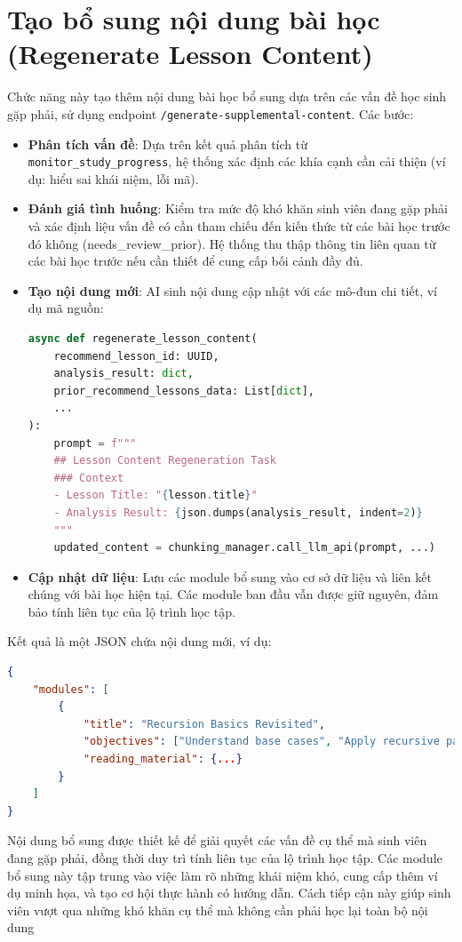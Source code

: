 \section{Tạo bổ sung nội dung bài học (Regenerate Lesson Content)}
Chức năng này tạo thêm nội dung bài học bổ sung dựa trên các vấn đề học sinh gặp phải, sử dụng endpoint \texttt{/generate-supplemental-content}. Các bước:
\begin{itemize}
    \item \textbf{Phân tích vấn đề}: Dựa trên kết quả phân tích từ \texttt{monitor\_study\_progress}, hệ thống xác định các khía cạnh cần cải thiện (ví dụ: hiểu sai khái niệm, lỗi mã).
    \item \textbf{Đánh giá tình huống}: Kiểm tra mức độ khó khăn sinh viên đang gặp phải và xác định liệu vấn đề có cần tham chiếu đến kiến thức từ các bài học trước đó không (needs\_review\_prior). Hệ thống thu thập thông tin liên quan từ các bài học trước nếu cần thiết để cung cấp bối cảnh đầy đủ.
    \item \textbf{Tạo nội dung mới}: AI sinh nội dung cập nhật với các mô-đun chi tiết, ví dụ mã nguồn:
    \begin{lstlisting}[language=Python]
async def regenerate_lesson_content(
    recommend_lesson_id: UUID,
    analysis_result: dict,
    prior_recommend_lessons_data: List[dict],
    ...
):
    prompt = f"""
    ## Lesson Content Regeneration Task
    ### Context
    - Lesson Title: "{lesson.title}"
    - Analysis Result: {json.dumps(analysis_result, indent=2)}
    """
    updated_content = chunking_manager.call_llm_api(prompt, ...)
    \end{lstlisting}
    \item \textbf{Cập nhật dữ liệu}: Lưu các module bổ sung vào cơ sở dữ liệu và liên kết chúng với bài học hiện tại. Các module ban đầu vẫn được giữ nguyên, đảm bảo tính liên tục của lộ trình học tập.
\end{itemize}

Kết quả là một JSON chứa nội dung mới, ví dụ:
\begin{lstlisting}[language=JSON]
{
    "modules": [
        {
            "title": "Recursion Basics Revisited",
            "objectives": ["Understand base cases", "Apply recursive patterns"],
            "reading_material": {...}
        }
    ]
}
\end{lstlisting}
Nội dung bổ sung được thiết kế để giải quyết các vấn đề cụ thể mà sinh viên đang gặp phải, đồng thời duy trì tính liên tục của lộ trình học tập. Các module bổ sung này tập trung vào việc làm rõ những khái niệm khó, cung cấp thêm ví dụ minh họa, và tạo cơ hội thực hành có hướng dẫn. Cách tiếp cận này giúp sinh viên vượt qua những khó khăn cụ thể mà không cần phải học lại toàn bộ nội dung

